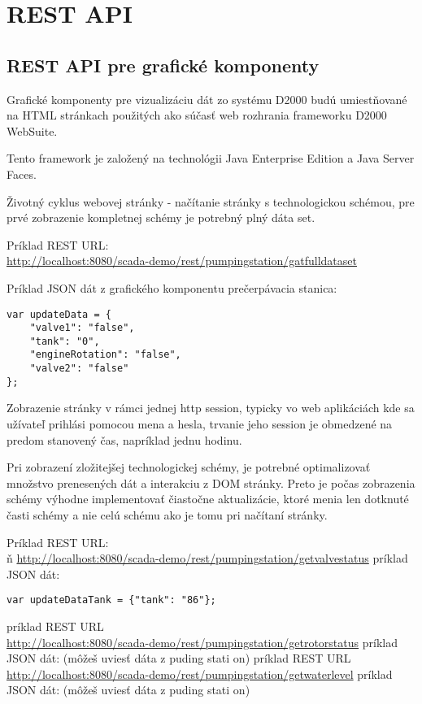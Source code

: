 \chapter{REST API}

\section{REST API pre grafické komponenty}
Grafické komponenty pre vizualizáciu dát zo systému D2000 budú umiestňované na HTML stránkach použitých ako súčasť web rozhrania frameworku D2000 WebSuite.

Tento framework je založený na technológii Java Enterprise Edition a Java Server Faces.

Životný cyklus webovej stránky - načítanie stránky s technologickou schémou, pre prvé zobrazenie kompletnej schémy je potrebný plný dáta set.


Príklad REST URL:\\
\url{http://localhost:8080/scada-demo/rest/pumpingstation/gatfulldataset}


Príklad JSON dát z grafického komponentu prečerpávacia stanica: 
\begin{lstlisting}
var updateData = {
	"valve1": "false",
	"tank": "0",
	"engineRotation": "false",
	"valve2": "false"
};
\end{lstlisting}


Zobrazenie stránky v rámci jednej http session, typicky vo web aplikáciách kde sa užívateľ prihlási pomocou mena a hesla, trvanie jeho session je obmedzené na predom stanovený čas, napríklad jednu hodinu.


Pri zobrazení zložitejšej technologickej schémy, je potrebné optimalizovať množstvo prenesených dát a interakciu z DOM stránky. Preto je počas zobrazenia schémy výhodne implementovať čiastočne aktualizácie, ktoré menia len dotknuté časti schémy a nie celú schému ako je tomu pri načítaní stránky.  

Príklad REST URL:\\ ň
\url{http://localhost:8080/scada-demo/rest/pumpingstation/getvalvestatus}
príklad JSON dát:
\begin{lstlisting}
var updateDataTank = {"tank": "86"};
\end{lstlisting}

príklad REST URL\\ \url{http://localhost:8080/scada-demo/rest/pumpingstation/getrotorstatus}
príklad JSON dát: (môžeš uviesť dáta z puding stati on)
príklad REST URL\\ \url{http://localhost:8080/scada-demo/rest/pumpingstation/getwaterlevel}
príklad JSON dát: (môžeš uviesť dáta z puding stati on)


